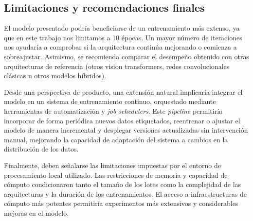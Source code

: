\subsection{Limitaciones y recomendaciones finales}

El modelo presentado podría beneficiarse de un entrenamiento más extenso, ya que en este trabajo nos limitamos a 10 épocas. Un mayor número de iteraciones nos ayudaría a comprobar si la arquitectura continúa mejorando o comienza a sobreajustar. Asimismo, se recomienda comparar el desempeño obtenido con otras arquitecturas de referencia (otros vision transformers, redes convolucionales clásicas u otros modelos híbridos).

Desde una perspectiva de producto, una extensión natural implicaría integrar el modelo en un sistema de entrenamiento continuo, orquestado mediante herramientas de automatización y \textit{job schedulers}. Este \textit{pipeline} permitiría incorporar de forma periódica nuevos datos etiquetados, reentrenar o ajustar el modelo de manera incremental y desplegar versiones actualizadas sin intervención manual, mejorando la capacidad de adaptación del sistema a cambios en la distribución de los datos.

Finalmente, deben señalarse las limitaciones impuestas por el entorno de procesamiento local utilizado. Las restricciones de memoria y capacidad de cómputo condicionaron tanto el tamaño de los lotes como la complejidad de las arquitecturas y la duración de los entrenamientos. El acceso a infraestructuras de cómputo más potentes permitiría experimentos más extensivos y considerables mejoras en el modelo.